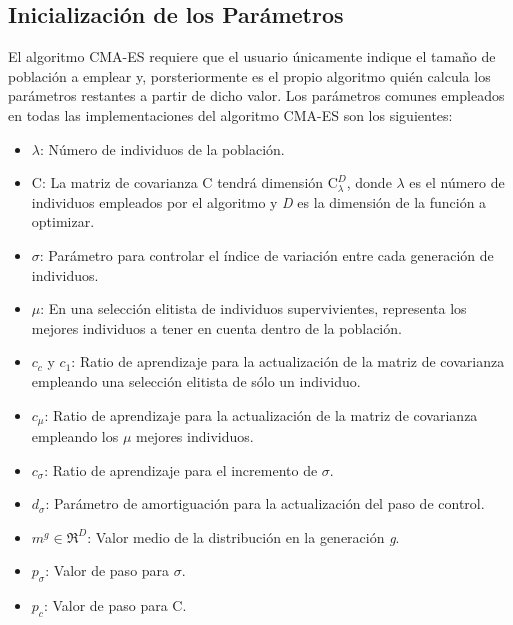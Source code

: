 \bigskip

\subsection{Inicialización de los Parámetros}

El algoritmo CMA-ES requiere que el usuario únicamente indique el tamaño de población a emplear y, porsteriormente es el propio algoritmo quién calcula los parámetros restantes a partir de dicho valor. Los parámetros comunes empleados en todas las implementaciones del algoritmo CMA-ES son los siguientes: 

\begin{itemize}
\item $\lambda$: Número de individuos de la población.
\item C: La matriz de covarianza C tendrá dimensión $\textrm{C}_{\lambda}^{D}$, donde $\lambda$ es el número de individuos empleados por el algoritmo y \textit{D} es la dimensión de la función a optimizar.
\item $\sigma$: Parámetro para controlar el índice de variación entre cada generación de individuos.
\item $\mu$: En una selección elitista de individuos supervivientes, representa los mejores individuos a tener en cuenta dentro de la población.
\item $c_{c}$ y $c_{1}$: Ratio de aprendizaje para la actualización de la matriz de covarianza empleando una selección elitista de sólo un individuo.
\item $c_{\mu}$: Ratio de aprendizaje para la actualización de la matriz de covarianza empleando los $\mu$ mejores individuos.
\item $c_{\sigma}$: Ratio de aprendizaje para el incremento de $\sigma$.
\item $d_{\sigma}$: Parámetro de amortiguación para la actualización del paso de control.
\item $m^{g} \in \Re^{D}$: Valor medio de la distribución en la generación \textit{g}.
\item $p_{\sigma}$: Valor de paso para $\sigma$.
\item $p_{c}$: Valor de paso para C.
\end{itemize}

